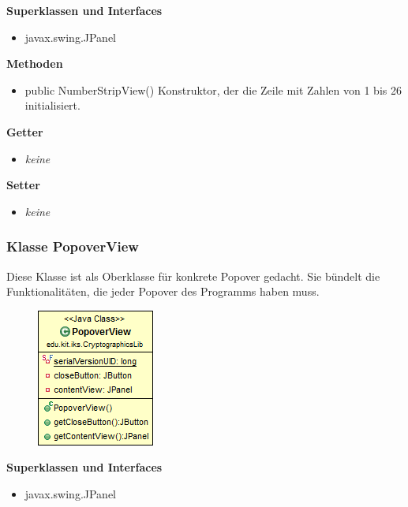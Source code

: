 \documentclass{article}
\begin{document}
      \textbf{Superklassen und Interfaces}
      \begin{itemize}
        \item javax.swing.JPanel
      \end{itemize}
	
      \textbf{Methoden}
      \begin{itemize}
        \item public NumberStripView() \newline
          Konstruktor, der die Zeile mit Zahlen von 1 bis 26 initialisiert.
      \end{itemize}
      
      \textbf{Getter}
      \begin{itemize}
		\item \textit{keine}
      \end{itemize}
      
      \textbf{Setter}
      \begin{itemize}
        \item \textit{keine}
      \end{itemize}
	
	\subsubsection{Klasse PopoverView}
	  Diese Klasse ist als Oberklasse für konkrete Popover gedacht. Sie
	  bündelt die Funktionalitäten, die jeder Popover des Programms haben muss.
	
      \begin{figure}[H]
        \centering
        \includegraphics{resources/edu-kit-iks-CryptographicsLib-PopoverView}
      \end{figure}
	
      \textbf{Superklassen und Interfaces}
      \begin{itemize}
        \item javax.swing.JPanel
      \end{itemize}
	
\end{document}
